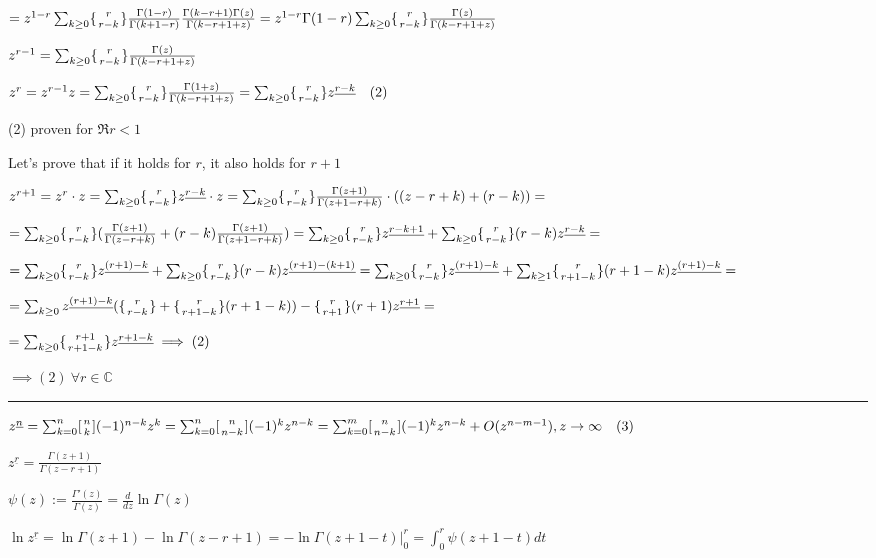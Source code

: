 \documentclass{article}
\begin{document}
\( = z^{1-r} \sum_{k \geq 0} \{{{r} \atop {r-k}}\} \frac{\Gamma(1-r)}{\Gamma(k+1-r)} \frac{\Gamma(k-r+1)\Gamma(z)}{\Gamma(k-r+1+z)} = z^{1-r} \Gamma(1-r) \sum_{k \geq 0} \{{{r} \atop {r-k}}\} \frac{\Gamma(z)}{\Gamma(k-r+1+z)} \)

\( z^{r-1} = \sum_{k \geq 0} \{{{r} \atop {r-k}}\} \frac{\Gamma(z)}{\Gamma(k-r+1+z)} \)

\( z^r = z^{r-1}z = \sum_{k \geq 0} \{{{r} \atop {r-k}}\} \frac{\Gamma(1+z)}{\Gamma(k-r+1+z)} = \sum_{k \geq 0} \{{{r} \atop {r-k}}\} z^{\underline{r-k}}\quad (2) \)

(2) proven for \( \Re r < 1 \)

Let's prove that if it holds for \( r \), it also holds for \( r + 1 \)

\( z^{r+1} = z^r \cdot z = \sum_{k \geq 0} \{{{r} \atop {r-k}}\} z^{\underline{r-k}} \cdot z = \sum_{k \geq 0} \{{{r} \atop {r-k}}\} \frac{\Gamma(z+1)}{\Gamma(z+1-r+k)} \cdot ((z-r+k) + (r-k)) = \)

\( = \sum_{k \geq 0} \{{{r} \atop {r-k}}\}( \frac{\Gamma(z+1)}{\Gamma(z-r+k)} + (r-k) \frac{\Gamma(z+1)}{\Gamma(z+1-r+k)}) = \sum_{k \geq 0} \{{{r} \atop {r-k}}\}z^{\underline{r-k+1}} + \sum_{k \geq 0} \{{{r} \atop {r-k}}\}(r-k)z^{\underline{r-k}} = \)

\( = \sum_{k \geq 0} \{{{r} \atop {r-k}}\}z^{\underline{(r+1)-k}} + \sum_{k \geq 0} \{{{r} \atop {r-k}}\}(r-k)z^{\underline{(r+1)-(k+1)}} = \sum_{k \geq 0} \{{{r} \atop {r-k}}\}z^{\underline{(r+1)-k}} + \sum_{k \geq 1} \{{{r} \atop {r + 1-k}}\}(r+1-k)z^{\underline{(r+1)-k}} = \)

\( = \sum_{k \geq 0} z^{\underline{(r+1)-k}} (\{{{r} \atop {r-k}}\} + \{{{r} \atop {r+1-k}}\}(r+1-k)) - \{{{r} \atop {r+1}}\}(r+1)z^{\underline{r+1}} = \)

\( = \sum_{k \geq 0} \{{{r+1} \atop {r+1-k}}\} z^{\underline{r+1-k}} \implies (2) \)

\( \implies (2)\ \forall r \in \mathbb{C} \)

\bigskip\hrule\bigskip

\( z^{\underline{n}} = \sum_{k=0}^n [{n \atop k}](-1)^{n-k}z^k = \sum_{k=0}^n [{n \atop {n-k}}](-1)^{k}z^{n-k} = \sum_{k=0}^m [{n \atop {n-k}}](-1)^{k}z^{n-k} + O(z^{n-m-1}), z \to \infty\quad(3) \)

\( z^{\underline{r}} = \frac{\Gamma(z+1)}{\Gamma(z-r+1)} \)

\( \psi(z) := \frac{\Gamma'(z)}{\Gamma(z)} = \frac{d}{dz} \ln \Gamma(z) \)

\( \ln z^{\underline{r}} = \ln \Gamma(z+1) - \ln \Gamma(z-r+1) = - \ln\Gamma(z+1-t) \Big|_0^r = \int_0^r \psi(z+1-t) dt \)
\end{document}
